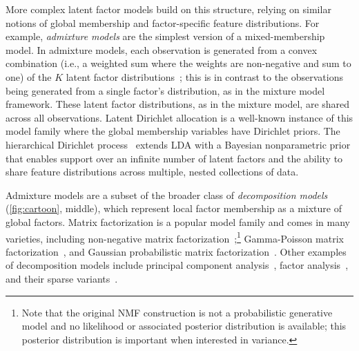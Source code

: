 \documentclass[twoside,11pt]{article}
\begin{document}
More complex latent factor models build on this structure, relying on similar notions of global membership and factor-specific feature distributions. For example, \emph{admixture models} are the simplest version of a mixed-membership model. In admixture models, each observation is generated from a convex combination (i.e., a weighted sum where the weights are non-negative and sum to one) of the $K$ latent factor distributions~\citep{pritchard2000inference}; this is in contrast to the observations being generated from a single factor's distribution, as in the mixture model framework.  These latent factor distributions, as in the mixture model, are shared across all observations. Latent Dirichlet allocation \citep[LDA;][]{Blei:2003b} is a well-known instance of this model family where the global membership variables have Dirichlet priors.  The hierarchical Dirichlet process~\citep[HDP;][]{Teh:2006} extends LDA with a Bayesian nonparametric prior that enables support over an infinite number of latent factors and the ability to share feature distributions across multiple, nested collections of data.

Admixture models are a subset of the broader class of \emph{decomposition models} (\cref{fig:cartoon}, middle), which represent local factor membership as a mixture of global factors.
Matrix factorization is a popular model family and comes in many varieties, including non-negative matrix factorization~\citep[NMF;][]{Lee01};\footnote{Note that the original NMF construction is not a probabilistic generative model and no likelihood or  associated posterior distribution is available; this posterior distribution is important when interested in variance.} Gamma-Poisson matrix factorization~\citep[GaP;][]{CannyGaP}, and Gaussian probabilistic matrix factorization~\citep[PMF;][]{PMF}.
Other examples of decomposition models include principal component analysis~\citep[PCA;][]{hotelling1933analysis,jolliffe1986principal, tipping1999probabilistic}, factor analysis~\citep[FA;][]{harman1960modern,jolliffe1986principal}, and
their sparse variants~\citep[respectively]{zou2006sparse,engelhardt2010analysis}.
\end{document}
